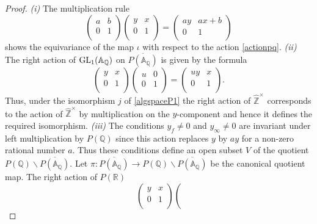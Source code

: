 \documentclass[graybox, envcountsect%
]{svmult}
\def\GL{{\rm GL}}
\def\A{{\mathbb A}}
\def\Q{{\mathbb Q}}
\def\R{{\mathbb R}}
\def\Z{{\mathbb Z}}
\def\hatz{{\hat\Z^\times}}
\begin{document}
\begin{proof} {\it (i)} The multiplication rule 
$$
\left(
\begin{array}{cc}
 a & b \\
 0 & 1 \\
\end{array}
\right)\left(
\begin{array}{cc}
 y & x \\
 0 & 1 \\
\end{array}
\right)=
\left(
\begin{array}{cc}
 ay & a x +b\\
 0 & 1 \\
\end{array}
\right)
$$
shows the equivariance of the map $\iota$ with respect to the action \eqref{actionpq}. \newline
{\it (ii)} The   right action of $\GL_1(\A_\Q)$ on $\overline{P(\A_\Q)}$ is given by the formula
$$
\left(
\begin{array}{cc}
 y & x \\
 0 & 1 \\
\end{array}
\right)\left(
\begin{array}{cc}
 u & 0 \\
 0 & 1 \\
\end{array}
\right)=
\left(
\begin{array}{cc}
 uy & x\\
 0 & 1 \\
\end{array}
\right).
$$
Thus, under the isomorphism $j$ of \eqref{algspaceP1} the right action of $\hatz$ corresponds to the action of $ \hatz$ by multiplication on the $y$-component and hence it defines the required isomorphism.\newline
{\it (iii)} The conditions $y_f\neq 0$ and $y_\infty \neq 0$ are invariant under left multiplication by  $P(\Q)$ since this action replaces $y$ by $ay$ for a non-zero rational number $a$. Thus these conditions define an open subset $V$ of the quotient $P(\Q)\backslash
\overline{P(\A_\Q)}$. Let $\pi:\overline{P(\A_\Q)}\to P(\Q)\backslash
\overline{P(\A_\Q)}$ be the canonical quotient map.    The right action of  $P(\R)$  
$$
\left(
\begin{array}{cc}
 y & x \\
 0 & 1 \\
\end{array}
\right)\left(
$$
\end{proof}
\end{document}
